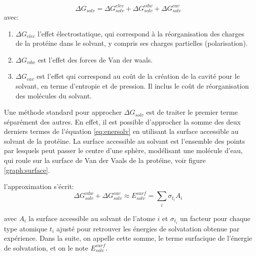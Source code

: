 \begin{equation}
  \label{eq:enersolv}
  \Delta G_{solv} = \Delta G_{solv}^{elec} + \Delta G_{solv}^{vdw} + \Delta G_{solv}^{cav}
\end{equation}
avec:

\begin{enumerate}
\item $\Delta G_{elec}$ l'effet électrostatique, qui correspond à la réorganisation des charges de la protéine dans le solvant, y compris ses charges partielles (polarisation).
\item $\Delta G_{vdw}$ est l'effet des forces de Van der waals.
  \item $\Delta G_{cav}$ est l'effet qui correspond au coût de la création de la cavité pour le solvant, en terme d'entropie et de pression. Il inclus le coût de réorganisation des molécules du solvant.
\end{enumerate}

Une méthode standard pour approcher $\Delta G_{solv}$ est de traiter le premier terme séparément des autres. En effet, il est possible d'approcher la somme des deux derniers termes de l'équation  \ref{eq:enersolv} en utilisant la surface accessible au solvant de la protéine. La surface accessible au solvant est l'ensemble des points par lesquels peut passer le centre d'une sphère, modélisant une molécule d'eau, qui roule sur la surface de Van der Vaals de la protéine, voir figure \ref{graph:surface}.

l'approximation s'écrit:
\begin{equation}
  \label{eq:SA}
\Delta G_{solv}^{vdw} + \Delta G_{solv}^{cav} \approx E_{solv}^{surf} = \sum_i \sigma_{t_i} A_i
\end{equation}

avec $A_i$ la surface accessible au solvant de l'atome $i$  et $\sigma_{t_i}$ un facteur pour chaque type atomique $t_i$ ajusté pour retrouver les énergies de solvatation obtenue par expérience.
Dans la suite, on appelle cette somme, le terme surfacique de l'énergie de solvatation, et on le note $E_{solv}^{surf}$.

